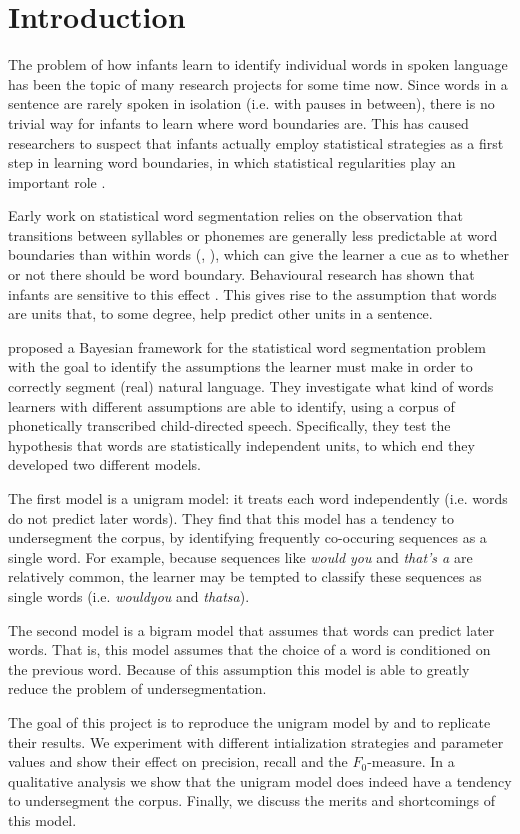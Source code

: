 \section{Introduction}

The problem of how infants learn to identify individual words in spoken language has been the topic of many research projects for some time now. Since words in a sentence are rarely spoken in isolation (i.e. with pauses in between), there is no trivial way for infants to learn where word boundaries are. This has caused researchers to suspect that infants actually employ statistical strategies as a first step in learning word boundaries, in which statistical regularities play an important role \cite{thiessen2003cues}.

Early work on statistical word segmentation relies on the observation that transitions between syllables or phonemes are generally less predictable at word boundaries than within words (\cite{harris1970phoneme}, \cite{saffran1996statistical}), which can give the learner a cue as to whether or not there should be word boundary. Behavioural research has shown that infants are sensitive to this effect \cite{saffran1996statistical} \cite{aslin1998computation}. This gives rise to the assumption that words are units that, to some degree, help predict other units in a sentence.

\citet{Goldwater200921} proposed a Bayesian framework for the statistical word segmentation problem with the goal to identify the assumptions the learner must make in order to correctly segment (real) natural language. They investigate what kind of words learners with different assumptions are able to identify, using a corpus of phonetically transcribed child-directed speech. Specifically, they test the hypothesis that words are statistically independent units, to which end they developed two different models.

The first model is a unigram model: it treats each word independently (i.e. words do not predict later words). They find that this model has a tendency to undersegment the corpus, by identifying frequently co-occuring sequences as a single word. For example, because sequences like \textit{would you} and \textit{that's a} are relatively common, the learner may be tempted to classify these sequences as single words (i.e. \textit{wouldyou} and \textit{thatsa}).

The second model is a bigram model that assumes that words can predict later words. That is, this model assumes that the choice of a word is conditioned on the previous word. Because of this assumption this model is able to greatly reduce the problem of undersegmentation.


The goal of this project is to reproduce the unigram model by \citet{Goldwater200921} and to replicate their results. We experiment with different intialization strategies and parameter values and show their effect on precision, recall and the $F_0$-measure. In a qualitative analysis we show that the unigram model does indeed have a tendency to undersegment the corpus. Finally, we discuss the merits and shortcomings of this model.

